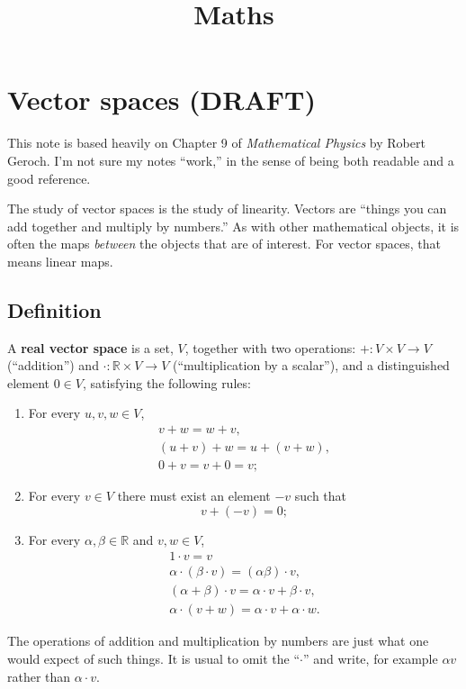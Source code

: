 \documentclass[10pt, a4paper, twocolumn]{article}
\title{Maths}
\newcommand{\R}{\mathbb{R}}
\newcommand{\defn}[1]{\textbf{#1}}
\begin{document}
\maketitle

\section{Vector spaces (DRAFT)}
This note is based heavily on Chapter 9 of \emph{Mathematical Physics} by Robert
Geroch. I'm not sure my notes “work,” in the sense of being both readable and a
good reference. 

The study of vector spaces is the study of linearity. Vectors are “things you
can add together and multiply by numbers.” As with other mathematical objects,
it is often the maps \emph{between} the objects that are of interest. For vector
spaces, that means linear maps.

\subsection{Definition}
A \defn{real vector space} is a set, $V$, together with two operations: ${+}:V \times
V \to V$ (“addition”) and ${\cdot}:\R \times V \to V$ (“multiplication by a scalar”), and a
distinguished element $ 0\in V$, satisfying the following rules:
\begin{enumerate}
\item
  For every $u, v, w \in V$,
  \begin{equation*}
    \begin{gathered}
      v + w = w + v, \\
      (u + v) + w = u + (v + w), \\
      0 + v = v + 0 = v;
      \end{gathered}
  \end{equation*}
\item For every $v \in V$ there must exist an element $-v$ such that
  \begin{equation*}
    v + (-v) = 0; 
  \end{equation*}
\item For every $\alpha, \beta \in \R$ and $v, w \in V$,
  \begin{equation*}
    \begin{gathered}
      1 \cdot v = v \\
      \alpha \cdot (\beta \cdot v) = (\alpha \beta) \cdot v, \\
      (\alpha + \beta) \cdot v = \alpha \cdot v + \beta \cdot v, \\
      \alpha \cdot (v + w) = \alpha \cdot v + \alpha \cdot w.
    \end{gathered}
  \end{equation*}
\end{enumerate}
The operations of addition and multiplication by numbers are just what one would
expect of such things. It is usual to omit the “$\cdot$” and write, for example $\alpha
v$ rather than $\alpha \cdot v$.
\end{document}

